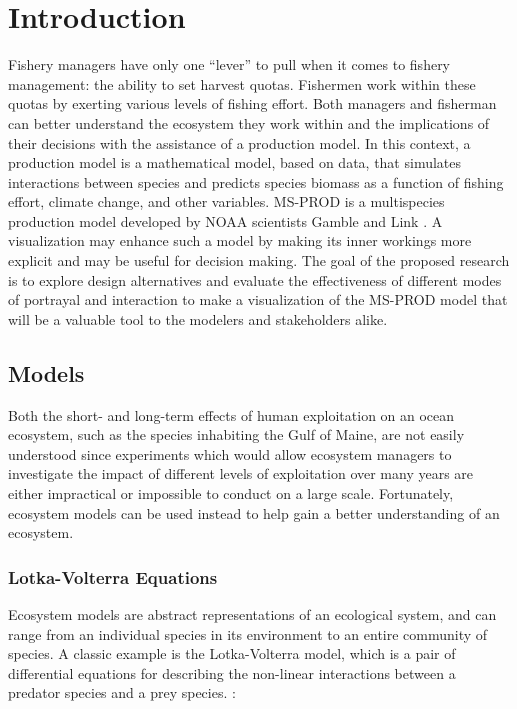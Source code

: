%

\chapter{Introduction}                %

Fishery managers have only one ``lever'' to pull when it comes to fishery management: the ability to set harvest quotas.  Fishermen work within these quotas by exerting various levels of fishing effort.  Both managers and fisherman can better understand the ecosystem they work within and the implications of their decisions with the assistance of a production model.  In this context, a production model is a mathematical model, based on data, that simulates interactions between species and predicts species biomass as a function of fishing effort, climate change, and other variables.  MS-PROD is a multispecies production model developed by NOAA scientists Gamble and Link \cite{gamble2009}.  A visualization may enhance such a model by making its inner workings more explicit and may be useful for decision making. The goal of the proposed research is to explore design alternatives and evaluate the effectiveness of different modes of portrayal and interaction to make a visualization of the MS-PROD model that will be a valuable tool to the modelers and stakeholders alike. 

\section{Models}

Both the short- and long-term effects of human exploitation on an ocean ecosystem, such as the species inhabiting the Gulf of Maine, are not easily understood since experiments which would allow ecosystem managers to investigate the impact of different levels of exploitation over many years are either impractical or impossible to conduct on a large scale.  Fortunately, ecosystem models can be used instead to help gain a better understanding of an ecosystem.

\subsection{Lotka-Volterra Equations}

Ecosystem models are abstract representations of an ecological system, and can range from an individual species in its environment to an entire community of species.  A classic example is the Lotka-Volterra model, which is a pair of differential equations for describing the non-linear interactions between a predator species and a prey species. \cite{lotka1926, volterra1926}:

